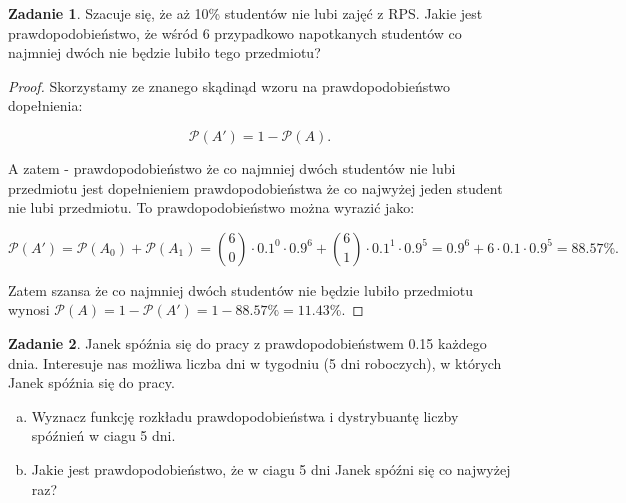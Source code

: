\documentclass[11pt]{article}
\theoremstyle{definition}
\newtheorem{zadanie}{Zadanie}
\numberwithin{zadanie}{section}
\begin{document}
\begin{zadanie}
    Szacuje się, że aż 10\% studentów nie lubi zajęć z RPS. Jakie jest prawdopodobieństwo, że wśród 6 przypadkowo
    napotkanych studentów co najmniej dwóch nie będzie lubiło tego przedmiotu?
\end{zadanie}
\begin{proof}
    Skorzystamy ze znanego skądinąd wzoru na prawdopodobieństwo dopełnienia:

    $$\mathcal P(A') = 1 - \mathcal P(A).$$

    A zatem - prawdopodobieństwo że co najmniej dwóch studentów nie lubi przedmiotu jest dopełnieniem prawdopodobieństwa że co najwyżej jeden student nie lubi przedmiotu. To prawdopodobieństwo można wyrazić jako:

    $$\mathcal P(A') = \mathcal P(A_0)+\mathcal P(A_1) = \binom60\cdot0.1^0\cdot0.9^6+\binom61\cdot0.1^1\cdot0.9^5 = 0.9^6+6\cdot0.1\cdot0.9^5 = 88.57\%.$$

    Zatem szansa że co najmniej dwóch studentów nie będzie lubiło przedmiotu wynosi $\mathcal P(A) = 1-\mathcal P(A') = 1-88.57\%=11.43\%$.

\end{proof}
\begin{zadanie}
    Janek spóźnia się do pracy z prawdopodobieństwem 0.15 każdego dnia. Interesuje nas możliwa liczba dni w tygodniu
    (5 dni roboczych), w których Janek spóźnia się do pracy.
    \begin{enumerate}[a)]
        \item Wyznacz funkcję rozkładu prawdopodobieństwa i dystrybuantę liczby spóźnień w ciagu 5 dni.
        \item Jakie jest prawdopodobieństwo, że w ciagu 5 dni Janek spóźni się co najwyżej raz?
    \end{enumerate}
\end{zadanie}
\end{document}
